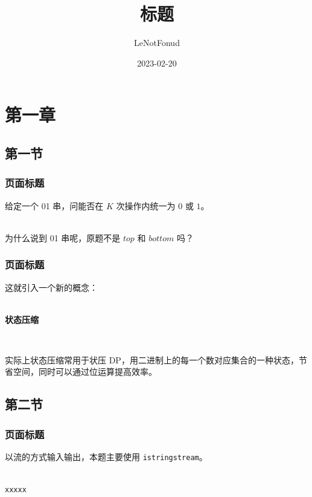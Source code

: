 \documentclass[aspectratio=169]{beamer} %
\title{标题}    %
\author{LeNotFonud} %
\institute{LeNotFound OI Team}  %
\date{2023-02-20}   %
\begin{document}
\frame{\titlepage} %

\section{第一章} %

\subsection{第一节} %

\begin{frame} %

    \frametitle{页面标题} %

    给定一个 01 串，问能否在 $K$ 次操作内统一为 $0$ 或 $1$。\\
    ~\
    \pause

    为什么说到 01 串呢，原题不是 $top$ 和 $bottom$ 吗？

\end{frame}

\begin{frame}
    \frametitle{页面标题}

    这就引入一个新的概念：\\
    ~\
    \begin{center}  %
        \textbf{状态压缩}   %
    \end{center}

    ~\  %

    \pause  %

    实际上状态压缩常用于状压 DP，用二进制上的每一个数对应集合的一种状态，节省空间，同时可以通过位运算提高效率。

\end{frame}

\subsection{第二节} %

\begin{frame}[fragile] %
    \frametitle{页面标题}

    以流的方式输入输出，本题主要使用 \verb|istringstream|。\\
    
    ~\

    \verb|xxxxx| %

\end{frame}
\end{document}
